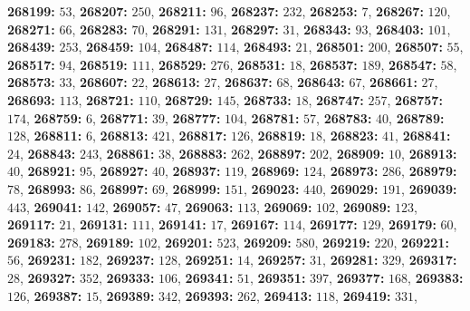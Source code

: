 \textsf{\bfseries 268199:} $53$, \textsf{\bfseries 268207:} $250$, \textsf{\bfseries 268211:} $96$, \textsf{\bfseries 268237:} $232$, \textsf{\bfseries 268253:} $7$, \textsf{\bfseries 268267:} $120$, \textsf{\bfseries 268271:} $66$, \textsf{\bfseries 268283:} $70$, \textsf{\bfseries 268291:} $131$, \textsf{\bfseries 268297:} $31$, \textsf{\bfseries 268343:} $93$, \textsf{\bfseries 268403:} $101$, \textsf{\bfseries 268439:} $253$, \textsf{\bfseries 268459:} $104$, \textsf{\bfseries 268487:} $114$, \textsf{\bfseries 268493:} $21$, \textsf{\bfseries 268501:} $200$, \textsf{\bfseries 268507:} $55$, \textsf{\bfseries 268517:} $94$, \textsf{\bfseries 268519:} $111$, \textsf{\bfseries 268529:} $276$, \textsf{\bfseries 268531:} $18$, \textsf{\bfseries 268537:} $189$, \textsf{\bfseries 268547:} $58$, \textsf{\bfseries 268573:} $33$, \textsf{\bfseries 268607:} $22$, \textsf{\bfseries 268613:} $27$, \textsf{\bfseries 268637:} $68$, \textsf{\bfseries 268643:} $67$, \textsf{\bfseries 268661:} $27$, \textsf{\bfseries 268693:} $113$, \textsf{\bfseries 268721:} $110$, \textsf{\bfseries 268729:} $145$, \textsf{\bfseries 268733:} $18$, \textsf{\bfseries 268747:} $257$, \textsf{\bfseries 268757:} $174$, \textsf{\bfseries 268759:} $6$, \textsf{\bfseries 268771:} $39$, \textsf{\bfseries 268777:} $104$, \textsf{\bfseries 268781:} $57$, \textsf{\bfseries 268783:} $40$, \textsf{\bfseries 268789:} $128$, \textsf{\bfseries 268811:} $6$, \textsf{\bfseries 268813:} $421$, \textsf{\bfseries 268817:} $126$, \textsf{\bfseries 268819:} $18$, \textsf{\bfseries 268823:} $41$, \textsf{\bfseries 268841:} $24$, \textsf{\bfseries 268843:} $243$, \textsf{\bfseries 268861:} $38$, \textsf{\bfseries 268883:} $262$, \textsf{\bfseries 268897:} $202$, \textsf{\bfseries 268909:} $10$, \textsf{\bfseries 268913:} $40$, \textsf{\bfseries 268921:} $95$, \textsf{\bfseries 268927:} $40$, \textsf{\bfseries 268937:} $119$, \textsf{\bfseries 268969:} $124$, \textsf{\bfseries 268973:} $286$, \textsf{\bfseries 268979:} $78$, \textsf{\bfseries 268993:} $86$, \textsf{\bfseries 268997:} $69$, \textsf{\bfseries 268999:} $151$, \textsf{\bfseries 269023:} $440$, \textsf{\bfseries 269029:} $191$, \textsf{\bfseries 269039:} $443$, \textsf{\bfseries 269041:} $142$, \textsf{\bfseries 269057:} $47$, \textsf{\bfseries 269063:} $113$, \textsf{\bfseries 269069:} $102$, \textsf{\bfseries 269089:} $123$, \textsf{\bfseries 269117:} $21$, \textsf{\bfseries 269131:} $111$, \textsf{\bfseries 269141:} $17$, \textsf{\bfseries 269167:} $114$, \textsf{\bfseries 269177:} $129$, \textsf{\bfseries 269179:} $60$, \textsf{\bfseries 269183:} $278$, \textsf{\bfseries 269189:} $102$, \textsf{\bfseries 269201:} $523$, \textsf{\bfseries 269209:} $580$, \textsf{\bfseries 269219:} $220$, \textsf{\bfseries 269221:} $56$, \textsf{\bfseries 269231:} $182$, \textsf{\bfseries 269237:} $128$, \textsf{\bfseries 269251:} $14$, \textsf{\bfseries 269257:} $31$, \textsf{\bfseries 269281:} $329$, \textsf{\bfseries 269317:} $28$, \textsf{\bfseries 269327:} $352$, \textsf{\bfseries 269333:} $106$, \textsf{\bfseries 269341:} $51$, \textsf{\bfseries 269351:} $397$, \textsf{\bfseries 269377:} $168$, \textsf{\bfseries 269383:} $126$, \textsf{\bfseries 269387:} $15$, \textsf{\bfseries 269389:} $342$, \textsf{\bfseries 269393:} $262$, \textsf{\bfseries 269413:} $118$, \textsf{\bfseries 269419:} $331$, 
